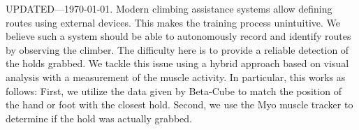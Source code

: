 UPDATED---\today.
Modern climbing assistance systems allow defining routes using external devices.
This makes the training process unintuitive.
We believe such a system should be able to autonomously record and identify routes by observing the climber.
The difficulty here is to provide a reliable detection of the holds grabbed.
We tackle this issue using a hybrid approach based on visual analysis with a measurement of the muscle activity.
In particular, this works as follows:
First, we utilize the data given by Beta-Cube to match the position of the hand or foot with the closest hold.
Second, we use the Myo muscle tracker to determine if the hold was actually grabbed.
  
